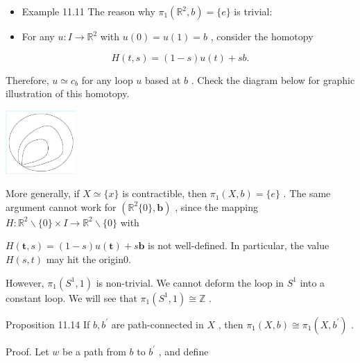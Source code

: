 \begin{itemize}
\item Example 11.11 The reason why \({\pi }_{1}\left( {{\mathbb{R}}^{2},b}\right)  = \{ e\}\) is trivial:
\end{itemize}

\begin{itemize}
\item For any \(u : I \rightarrow  {\mathbb{R}}^{2}\) with \(u\left( 0\right)  = u\left( 1\right)  = b\) , consider the homotopy
\end{itemize}

\[
H\left( {t,s}\right)  = \left( {1 - s}\right) u\left( t\right)  + {sb}.
\]

Therefore, \(u \simeq  {c}_{b}\) for any loop \(u\) based at \(b\) . Check the diagram below for graphic illustration of this homotopy.

\begin{center}
\includegraphics[max width=0.2\textwidth]{images/bo_d2bcsrref24c73avs720_118_659_1622_339_309_0.jpg}
\end{center}
\hspace*{3em} 

More generally, if \(X \simeq  \{ x\}\) is contractible, then \({\pi }_{1}\left( {X,b}\right)  = \{ e\}\) . The same argument cannot work for \(\left( {{\mathbb{R}}^{2}\{ 0\} ,\mathbf{b}}\right)\) , since the mapping \(H : {\mathbb{R}}^{2} \smallsetminus  \{ 0\}  \times  I \rightarrow  {\mathbb{R}}^{2} \smallsetminus  \{ 0\}\) with

\(H\left( {\mathbf{t},s}\right)  = \left( {1 - s}\right) u\left( \mathbf{t}\right)  + s\mathbf{b}\) is not well-defined. In particular, the value \(H\left( {s,t}\right)\) may hit the origin0.

However, \({\pi }_{1}\left( {{S}^{1},1}\right)\) is non-trivial. We cannot deform the loop in \({S}^{1}\) into a constant loop. We will see that \({\pi }_{1}\left( {{S}^{1},1}\right)  \cong  \mathbb{Z}\) .

Proposition 11.14 If \(b,{b}^{\prime }\) are path-connected in \(X\) , then \({\pi }_{1}\left( {X,b}\right)  \cong  {\pi }_{1}\left( {X,{b}^{\prime }}\right)\) .

Proof. Let \(w\) be a path from \(b\) to \({b}^{\prime }\) , and define

